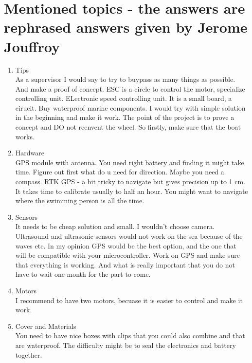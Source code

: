 \documentclass{article}[10pt]
\begin{document}
\section{Mentioned topics - the answers are rephrased answers given by Jerome Jouffroy}
\begin{enumerate}
    \item Tips\\
    As a supervisor I would say to try to buypass as many things as possible. And make a proof of concept. ESC is a circle to control the motor, specialize controlling unit. ELectronic speed controlling unit.
It is a small board, a cirucit. Buy waterproof marine components. I would try with simple solution in the beginning and make it work. The point of the project is to prove a concept and DO not reenvent the wheel. So firstly, make sure that the boat works.
    \item Hardware\\
GPS module with antenna.  You need right battery and finding it might take time. Figure out first what do u need 
for direction. Maybe you need a compass. RTK GPS - a bit tricky to navigate but gives precision up to 1 cm. It takes time to calibrate 
usually to half an hour. You might want to navigate where the swimming person is all the time. 
    \item Sensors\\
It needs to be cheap solution and small. I wouldn't choose camera. Ultrasound and ultrasonic sensors would not work on the sea because of the waves etc. 
In my opinion GPS would be the best option, and the one that will be compatible with your microcontroller. Work on GPS and make sure that everything is working. 
And what is really important that you do not have to wait one month for the part to come. 
    \item Motors\\
I recommend to have two motors, becuase it is easier to control and make it work. 
    \item Cover and Materials\\
You need to have nice boxes with clips that you could also combine and that are waterproof. The difficulty might be to seal the electronics and battery together.

\end{enumerate}
\end{document}
